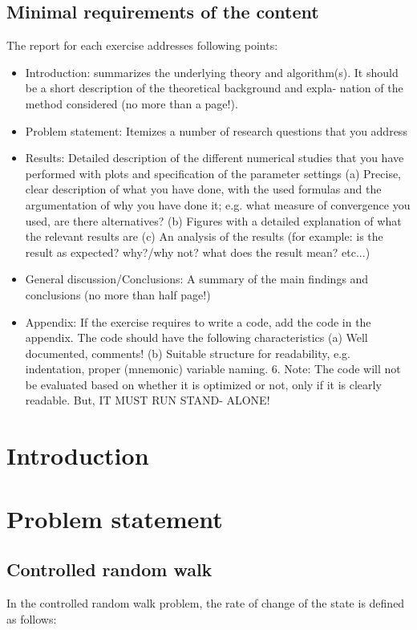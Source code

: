 \documentclass[10pt,a4paper]{article}
\begin{document}
\subsection{Minimal requirements of the content}
The report for each exercise addresses following points:
\begin{itemize}
\item Introduction: summarizes the underlying theory and algorithm(s). It should be a short description of the theoretical background and expla- nation of the method considered (no more than a page!).
\item Problem statement: Itemizes a number of research questions that you address
\item Results: Detailed description of the different numerical studies that you have performed with plots and specification of the parameter settings (a) Precise, clear description of what you have done, with the used formulas and the argumentation of why you have done it; e.g. what measure of convergence you used, are there alternatives? (b) Figures with a detailed explanation of what the relevant results are (c) An analysis of the results (for example: is the result as expected? why?/why not? what does the result mean? etc...)
\item General discussion/Conclusions: A summary of the main findings and conclusions (no more than half page!)
\item Appendix: If the exercise requires to write a code, add the code in the appendix. The code should have the following characteristics (a) Well documented, comments! (b) Suitable structure for readability, e.g. indentation, proper (mnemonic) variable naming. 6. Note: The code will not be evaluated based on whether it is optimized or not, only if it is clearly readable. But, IT MUST RUN STAND- ALONE!
\end{itemize}

\color{black}
\fi

\newpage
\section{Introduction}


\section{Problem statement}
\subsection{Controlled random walk}
In the controlled random walk problem, the rate of change of the state is defined as follows:
\end{document}
